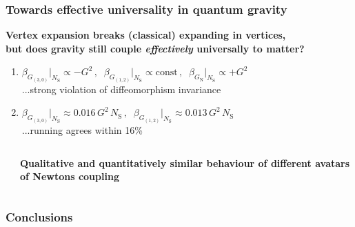 \documentclass[]{beamer}  %
\newcommand\NS{ N_{\scriptscriptstyle{\mathrm{S}}} }
\newcommand\GNewton{ G_{\scriptscriptstyle{\mathrm{N}}}{} }
\begin{document}
\begin{frame}
  \frametitle{Towards effective universality in quantum gravity}

  \begin{center}
    \textbf{
      Vertex expansion breaks (classical) expanding in vertices,\\
      but does gravity still couple \textit{effectively} universally to matter?
    }
  \end{center}

  \begin{enumerate}
    \item
      {\makebox[95pt]
        {$\boxed{ \eta_h \big|_{\NS} = 0 }$}
        {$\beta_{G_{(3,0)}}\Big|_{\NS} \propto -G^2 \,, \;\;
          \beta_{G_{(1,2)}}\Big|_{\NS} \propto \mathrm{const} \,, \;\;
      \beta_{\GNewton}\Big|_{\NS}  \propto +G^2$}}\\
      \fontsize{6pt}{7.2}\selectfont
      \hfill ...strong violation of diffeomorphism invariance
      \fontsize{8pt}{7.2}\selectfont

      \vspace{5pt}
    \item
      {\makebox[95pt]
        {$\boxed{ \eta_h \big|_{\NS} = G_{(1,2)} \, \frac{\NS}{24 \pi} }$}
        {$\beta_{G_{(3,0)}}\Big|_{\NS}  \approx 0.016 \, G^2 \, \NS \,, \;\;
      \beta_{G_{(1,2)}} \Big|_{\NS} \approx 0.013 \, G^2 \, \NS$}}\\
      \fontsize{6pt}{7.2}\selectfont
      \hfill ...running agrees within 16\%
      \fontsize{8pt}{7.2}\selectfont
  \end{enumerate}

  \vspace{-15pt}
  \begin{columns}[T]
    \begin{column}{.8\textwidth}
      \begin{center}
      
    \end{center}
    \end{column}

    \hspace{-55pt}
    \begin{column}{.3\textwidth}
      \vspace{50pt}
      \begin{center}
        \textbf{
          Qualitative and quantitatively similar behaviour of different avatars
          of Newtons coupling
        }
      \end{center}
    \end{column}
  \end{columns}
\end{frame}



\begin{frame}
  \frametitle{Conclusions}
\end{frame}


\begin{frame}
  \titlepage
\end{frame}
\end{document}
